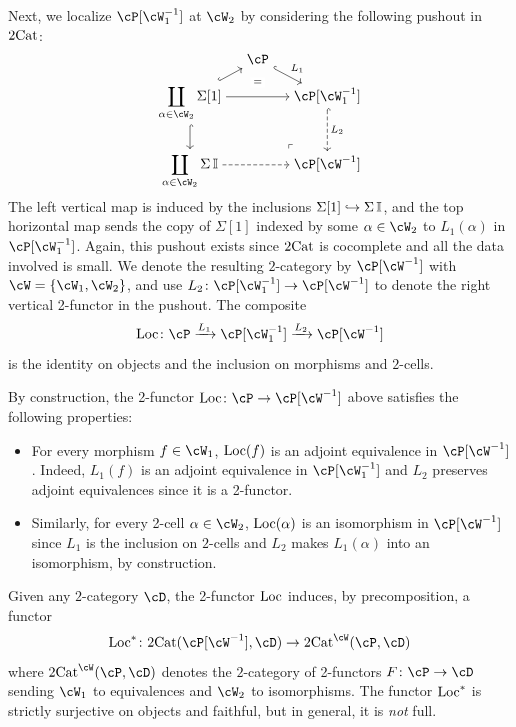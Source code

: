 \documentclass[11pt, dvipsnames]{amsart}
\begin{document}
\begin{constr}
    Next, we localize $\cP[\cW_1^{-1}]$ at $\cW_2$ by considering the following pushout in $2\mathrm{Cat}$:
	\[\begin{tikzcd}[ampersand replacement=\&,cramped, sep=small]
		\& \cP \& \\
		{\displaystyle\coprod_{\alpha \in \cW_2} \Sigma[1]} \&\& {\cP[\cW_1^{-1}]} \\
		\\
		{\displaystyle\coprod_{\alpha \in \cW_2} \Sigma\interval} \&\& {{\cP}[{\cW}^{-1}]}
		\arrow["{L_1}", hook, from=1-2, to=2-3]
		\arrow[hook, from=2-1, to=1-2]
		\arrow[""{name=0, anchor=center, inner sep=0}, from=2-1, to=2-3]
		\arrow[hook,from=2-1, to=4-1]
		\arrow["{L_2}", dashed, hook, from=2-3, to=4-3]
		\arrow[dashed, from=4-1, to=4-3]
		\arrow["\lrcorner"{anchor=center, pos=0.125, rotate=180}, draw=none, from=4-3, to=2-1]
		\arrow["{=}"{description}, draw=none, from=0, to=1-2]
	\end{tikzcd}\]
	The left vertical map is induced by the inclusions $\Sigma[1] \hookrightarrow \Sigma\operatorname{\mathbb{I}}$, and the top horizontal map sends the copy of $\Sigma[1]$ indexed by some $\alpha \in \cW_2$ to  $L_1(\alpha)$ in $\cP[\cW_1^{-1}]$. Again, this pushout exists since $2\mathrm{Cat}$ is cocomplete and all the data involved is small. We denote the resulting $2$-category by $\cP[\cW^{-1}]$ with $\cW = \{ \cW_1, \cW_2 \}$, and use $L_2\colon \cP[\cW_1^{-1}] \to \cP[\cW^{-1}]$ to denote the right vertical 2-functor in the pushout.
    The composite
	\[ \Loc \colon \cP \xrightarrow{L_1} \cP[\cW_1^{-1}] \xrightarrow{L_2} \cP[\cW^{-1}] \]
	is the identity on objects and the inclusion on morphisms and $2$-cells.
\end{constr}

\begin{rmk}\label{rmk:localization_properties}
	By construction, the 2-functor $\Loc\colon \cP \to \cP[\cW^{-1}]$ above satisfies the following properties:
	\begin{itemize}
		\item For every morphism $f \in \cW_1$, $\operatorname{Loc}(f)$ is an adjoint equivalence in $\cP[\cW^{-1}]$. Indeed, $L_1(f)$ is an adjoint equivalence in $\cP[\cW_1^{-1}]$ and $L_2$ preserves adjoint equivalences since it is a 2-functor.
		\item Similarly, for every 2-cell $\alpha \in \cW_2$, $\operatorname{Loc}(\alpha)$ is an isomorphism in $\cP[\cW^{-1}]$ since $L_1$ is the inclusion on $2$-cells and $L_2$ makes $L_1(\alpha)$ into an isomorphism, by construction.
	\end{itemize}
	Given any $2$-category $\cD$, the 2-functor $\operatorname{Loc}$ induces, by precomposition, a functor
	\begin{equation}\label{eq:universal_property_localization}
		\Loc^*\colon \twocat(\cP[\cW^{-1}], \cD) \to \twocat^{\cW}(\cP, \cD)
	\end{equation}
	where $\twocat^{\cW}(\cP, \cD)$ denotes the $2$-category of 2-functors $F\colon \cP \to \cD$ sending $\cW_1$ to equivalences and $\cW_2$ to isomorphisms. 
	The functor $\operatorname{Loc}^*$ is strictly surjective on objects and faithful, but in general, it is \emph{not} full.  
\end{rmk}
\end{document}
